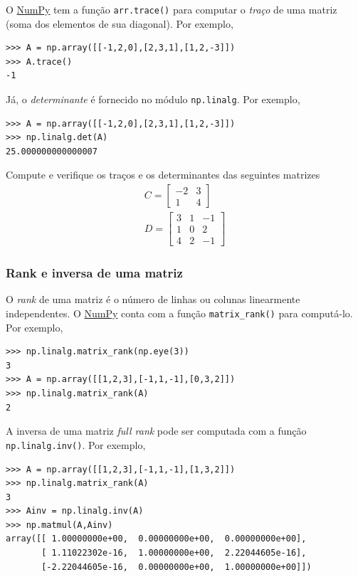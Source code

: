 \documentclass[12pt]{article}
\begin{document}
O \href{https://numpy.org/}{NumPy} tem a função \lstinline+arr.trace()+ para computar o \emph{traço} de uma matriz (soma dos elementos de sua diagonal). Por exemplo,

\begin{lstlisting}
>>> A = np.array([[-1,2,0],[2,3,1],[1,2,-3]])
>>> A.trace()
-1
\end{lstlisting}

Já, o \emph{determinante} é fornecido no módulo \lstinline+np.linalg+. Por exemplo,

\begin{lstlisting}
>>> A = np.array([[-1,2,0],[2,3,1],[1,2,-3]])
>>> np.linalg.det(A)
25.000000000000007
\end{lstlisting}

\begin{exr}
  Compute e verifique os traços e os determinantes das seguintes matrizes
  \begin{gather}
    C =
    \begin{bmatrix}
      -2 & 3 \\
      1 & 4
    \end{bmatrix}\\
    D =
    \begin{bmatrix}
      3 & 1 & -1 \\
      1 & 0 & 2 \\
      4 & 2 & -1
    \end{bmatrix}
  \end{gather}
\end{exr}

\subsubsection{Rank e inversa de uma matriz}

O \emph{rank} de uma matriz é o número de linhas ou colunas linearmente independentes. O \href{https://numpy.org/}{NumPy} conta com a função \lstinline+matrix_rank()+ para computá-lo. Por exemplo,

\begin{lstlisting}
>>> np.linalg.matrix_rank(np.eye(3))
3
>>> A = np.array([[1,2,3],[-1,1,-1],[0,3,2]])
>>> np.linalg.matrix_rank(A)
2
\end{lstlisting}

A inversa de uma matriz \emph{full rank} pode ser computada com a função \lstinline+np.linalg.inv()+. Por exemplo,

\begin{lstlisting}
>>> A = np.array([[1,2,3],[-1,1,-1],[1,3,2]])
>>> np.linalg.matrix_rank(A)
3
>>> Ainv = np.linalg.inv(A)
>>> np.matmul(A,Ainv)
array([[ 1.00000000e+00,  0.00000000e+00,  0.00000000e+00],
       [ 1.11022302e-16,  1.00000000e+00,  2.22044605e-16],
       [-2.22044605e-16,  0.00000000e+00,  1.00000000e+00]])
\end{lstlisting}
\end{document}
